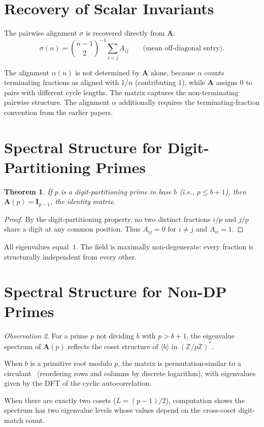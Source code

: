 \documentclass[12pt]{amsart}
\newtheorem{theorem}{Theorem}
\theoremstyle{definition}
\theoremstyle{remark}
\newtheorem{observation}[theorem]{Observation}
\begin{document}
\section{Recovery of Scalar Invariants}

The pairwise alignment $\sigma$ is recovered directly
from $\mathbf{A}$:
\[
\sigma(n) = \binom{n-1}{2}^{-1} \sum_{i<j} A_{ij}
\qquad \text{(mean off-diagonal entry)}.
\]

The alignment $\alpha(n)$ is not determined by
$\mathbf{A}$ alone, because $\alpha$ counts terminating
fractions as aligned with $1/n$ (contributing $1$),
while $\mathbf{A}$ assigns $0$ to pairs with different
cycle lengths. The matrix captures the non-terminating
pairwise structure. The alignment $\alpha$ additionally
requires the terminating-fraction convention from the
earlier papers.

\section{Spectral Structure for Digit-Partitioning Primes}

\begin{theorem}\label{thm:dp-identity}
If $p$ is a digit-partitioning prime in base $b$ (i.e., $p \le b{+}1$),
then $\mathbf{A}(p) = \mathbf{I}_{p-1}$, the identity matrix.
\end{theorem}

\begin{proof}
By the digit-partitioning property, no two distinct fractions
$i/p$ and $j/p$ share a digit at any common position. Thus
$A_{ij} = 0$ for $i \ne j$ and $A_{ii} = 1$.
\end{proof}

All eigenvalues equal~$1$. The field is maximally non-degenerate:
every fraction is structurally independent from every other.

\section{Spectral Structure for Non-DP Primes}

\begin{observation}\label{obs:non-dp-spectrum}
For a prime $p$ not dividing $b$ with $p > b{+}1$,
the eigenvalue spectrum of $\mathbf{A}(p)$ reflects
the coset structure of $\langle b \rangle$ in
$(\mathbb{Z}/p\mathbb{Z})^{*}$.

When $b$ is a primitive root modulo $p$, the matrix
is permutation-similar to a circulant~\cite{davis}
(reordering rows and columns by discrete logarithm),
with eigenvalues given by the DFT of the cyclic
autocorrelation.

When there are exactly two cosets ($L = (p{-}1)/2$),
computation shows the spectrum has two eigenvalue
levels whose values depend on the cross-coset
digit-match count.
\end{observation}
\end{document}
